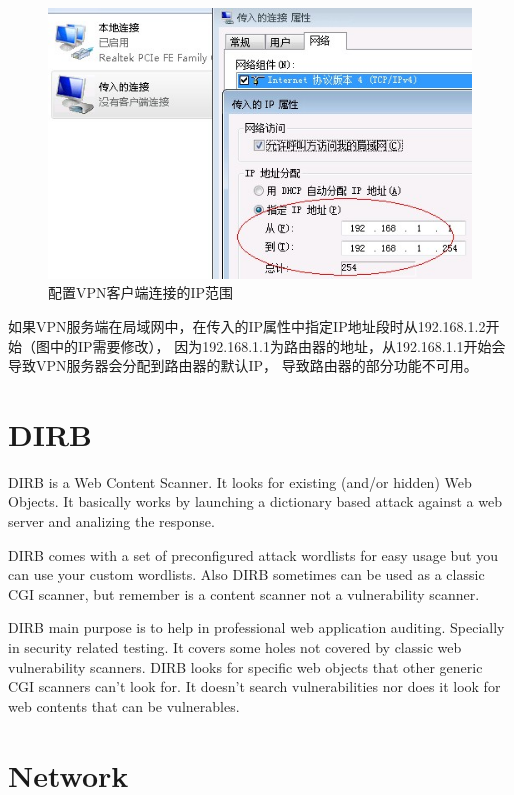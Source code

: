\documentclass{book}
\begin{document}
\begin{figure}[htbp]
	\centering
	\includegraphics[scale=0.8]{ConfigurationVPNIPAddressRange.jpg}
	\caption{配置VPN客户端连接的IP范围}
	\label{fig:ConfigurationVPNIPAddressRange}
\end{figure}

如果VPN服务端在局域网中，在传入的IP属性中指定IP地址段时从192.168.1.2开始（图中的IP需要修改），
因为192.168.1.1为路由器的地址，从192.168.1.1开始会导致VPN服务器会分配到路由器的默认IP，
导致路由器的部分功能不可用。

\section{DIRB}

DIRB is a Web Content Scanner. It looks for existing (and/or hidden) Web 
Objects. It basically works by launching a dictionary based attack against 
a web server and analizing the response.

DIRB comes with a set of preconfigured attack wordlists for easy usage but 
you can use your custom wordlists. Also DIRB sometimes can be used as a 
classic CGI scanner, but remember is a content scanner not a vulnerability 
scanner.

DIRB main purpose is to help in professional web application auditing. 
Specially in security related testing. It covers some holes not covered by 
classic web vulnerability scanners. DIRB looks for specific web objects that 
other generic CGI scanners can't look for. It doesn't search vulnerabilities 
nor does it look for web contents that can be vulnerables.

\section{Network}
\end{document}
